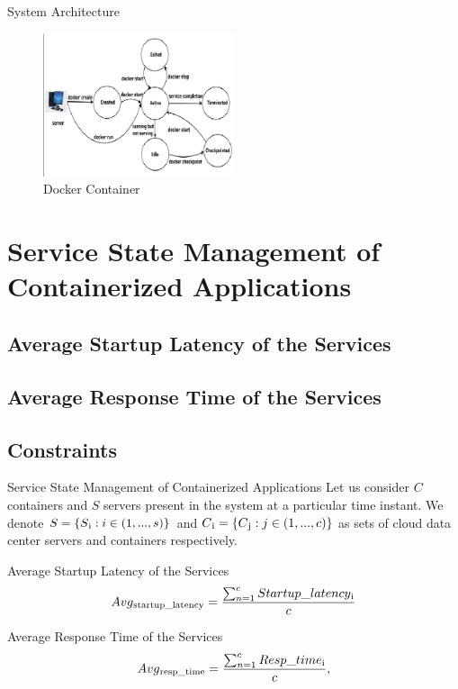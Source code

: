 \documentclass[UKenglish]{beamer}
\begin{document}
\begin{frame}{System Architecture}
\vspace{20pt}
    \begin{figure}[htbp]
\centerline{\includegraphics[width=0.5\textwidth]{fig2}}
\caption{Docker Container}
\label{fig}
\end{figure}
\end{frame}


\section{Service State Management of Containerized
Applications}
\SectionPage
\subsection{Average Startup Latency of the Services}
\subsection{Average Response Time of the Services}
\subsection{Constraints}

\begin{frame}{Service State Management of Containerized
Applications}
    Let us consider $C$ containers and $S$ servers present in the
system at a particular time instant. We denote \begin{math} S = \{ S\textsubscript{i} :   i \in (1,...,s) \} \end{math} and \begin{math} C\textsubscript{i} = \{C\textsubscript{j} : j \in (1,...,c)\}\end{math} as sets of cloud
data center servers and containers respectively.

    \begin{alertblock}{Average Startup Latency of the Services}
       \begin{align*} Avg\textsubscript{startup\_latency} =\frac {\sum_{n=1}^{c} Startup\_latency\textsubscript{i}} {c} \end{align*}
    \end{alertblock}

\begin{alertblock}{Average Response Time of the Services}
      \begin{align*} Avg\textsubscript{resp\_time} =\frac {\sum_{n=1}^{c} Resp\_time\textsubscript{i}} {c} ,\end{align*}
    \end{alertblock}
   
\end{frame}
\end{document}
